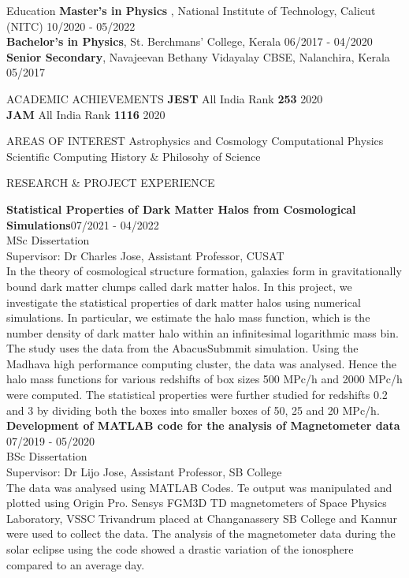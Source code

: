 \documentclass{resume} %
\begin{document}
\begin{rSection}{Education}
{\bf Master's in Physics }, National Institute of Technology, Calicut (NITC) \hfill {10/2020 - 05/2022} \\
{\bf Bachelor’s in Physics}, St. Berchmans’ College, Kerala \hfill {06/2017 - 04/2020}\\
{\bf Senior Secondary}, Navajeevan Bethany Vidayalay CBSE, Nalanchira, Kerala \hfill {05/2017}
\end{rSection}

\begin{rSection}{ACADEMIC ACHIEVEMENTS}
\textbf{JEST} All India Rank \textbf{253} \hfill 2020 \\
\textbf{JAM} All India Rank \textbf{1116} \hfill 2020

\end{rSection}

\begin{rSection}{AREAS OF INTEREST }
Astrophysics and Cosmology \textbar{} Computational Physics  \textbar{} Scientific Computing \textbar{} History \& Philosohy of Science
\end{rSection}

\begin{rSection}{RESEARCH \& PROJECT EXPERIENCE}


\textbf {Statistical Properties of Dark Matter Halos from Cosmological Simulations}\hfill 07/2021 - 04/2022 \\ 
MSc Dissertation \\
Supervisor: Dr Charles Jose, Assistant Professor, CUSAT \\
In the theory of cosmological structure formation, galaxies form in gravitationally bound dark matter clumps called dark matter halos. In this project, we investigate the statistical properties of dark matter halos using numerical simulations. In particular, we estimate the halo mass function, which is the number density of dark matter halo within an infinitesimal logarithmic mass bin. The study uses the data from the AbacusSubmmit simulation. Using the Madhava high performance computing cluster, the data was analysed. Hence the halo mass functions for various redshifts of box sizes 500 MPc/h and 2000 MPc/h were computed. The statistical properties were further studied for redshifts 0.2 and 3 by dividing both the boxes into smaller boxes of 50, 25 and 20 MPc/h. \\


\textbf {Development of MATLAB code for the analysis of Magnetometer data}  \hfill 07/2019 - 05/2020 \\ 
BSc Dissertation\\
Supervisor: Dr Lijo Jose, Assistant Professor, SB College \\ 
The data was analysed using MATLAB Codes. Te output was manipulated and plotted using Origin Pro. Sensys FGM3D TD magnetometers of Space Physics Laboratory, VSSC Trivandrum placed at Changanassery SB College and Kannur were used to collect the data. The analysis of the magnetometer data during the solar eclipse using the code showed a drastic variation of the ionosphere compared to an average day. 
\end{rSection} 
\end{document}
